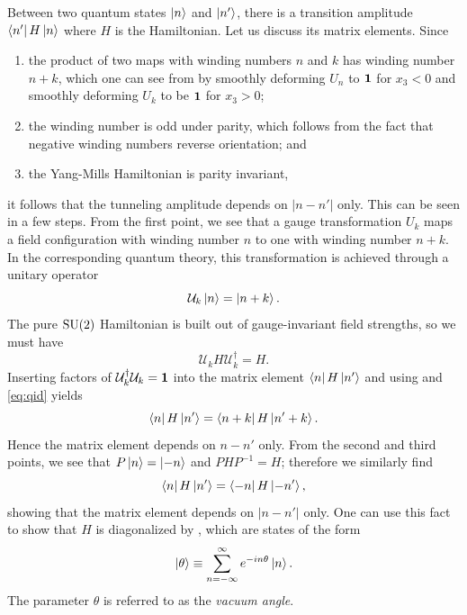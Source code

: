 Between two quantum states $\ket{n}$ and $\ket{n'}$, there is a 
transition amplitude $\bra{n'}H\ket{n}$ where $H$ is the Hamiltonian. 
Let us discuss its matrix elements. Since 
\begin{enumerate}
  \item the product of two maps with winding numbers $n$ and $k$ 
        has winding number $n+k$, which one can see from 
        by smoothly deforming $U_n$ to ${\mathbf 1}$ for $x_3<0$ and
        smoothly deforming $U_k$ to be ${\mathbf 1}$ for $x_3>0$;
  \item the winding number is odd under parity, which follows from the
        fact that negative winding numbers reverse orientation; and
  \item the Yang-Mills Hamiltonian is parity invariant,
\end{enumerate}
it follows that the tunneling amplitude depends on $|n-n'|$ only.
This can be seen in a few steps. From the first point, we see that
a gauge transformation $U_k$ maps a field configuration with
winding number $n$ to one with winding number $n+k$. In the
corresponding quantum theory, this transformation is achieved 
through a unitary operator
\begin{equation}\label{eq:qwn}
  \mathcal{U}_k\ket{n}=\ket{n+k}.
\end{equation}
The pure $\operatorname{SU}(2)$ Hamiltonian is built out of gauge-invariant
field strengths, so we must have 
\begin{equation}\label{eq:qid}
  \mathcal{U}_kH\mathcal{U}_k^\dagger=H.
\end{equation}
Inserting factors of $\mathcal{U}_k^\dagger\mathcal{U}_k={\mathbf 1}$ into
the matrix element $\bra{n}H\ket{n'}$ and using 
and \eqref{eq:qid} yields
\begin{equation}
  \bra{n}H\ket{n'}=\bra{n+k}H\ket{n'+k}.
\end{equation}
Hence the matrix element depends on $n-n'$ only. From the second and
third points, we see that $P\ket{n}=\ket{-n}$ and $PHP^{-1}=H$;
therefore we similarly find
\begin{equation}
  \bra{n}H\ket{n'}=\bra{-n}H\ket{-n'},
\end{equation}
showing that the matrix element depends on $|n-n'|$ only.
One can use this fact to show that $H$ is diagonalized by 
, which are states of the form
\begin{equation}
  \ket{\theta}\equiv\sum\limits_{n=-\infty}^\infty e^{-i n\theta}\ket{n}.
\end{equation}
The parameter $\theta$ is referred to as the {\it vacuum angle}. 



